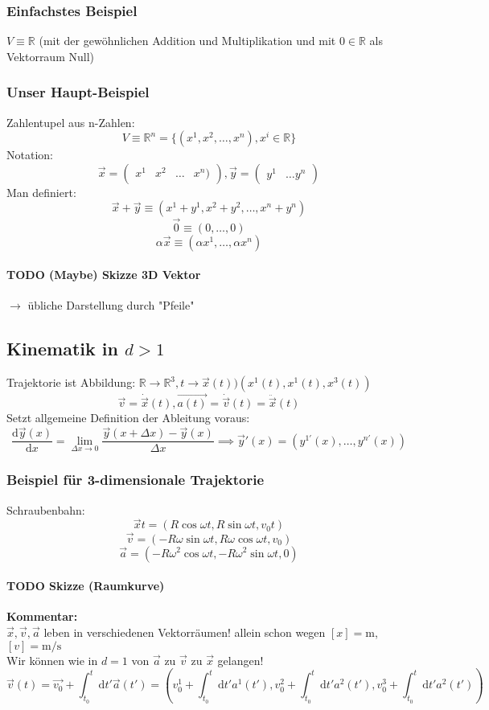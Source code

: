 \documentclass[a4paper]{scrartcl}
\theoremstyle{definition}
\theoremstyle{plain}
\theoremstyle{remark}
\theoremstyle{remark}
\begin{document}
\subsubsection{Einfachstes Beispiel}
\label{sec-2-4-1}
$V\equiv \mathbb{R}$ (mit der gewöhnlichen Addition und Multiplikation und mit $0\in\mathbb{R}$ als Vektorraum Null)
\subsubsection{Unser Haupt-Beispiel}
\label{sec-2-4-2}
Zahlentupel aus n-Zahlen:
\[V\equiv \mathbb{R}^n = \{(x^1,x^2,\ldots,x^n), x^i \in\mathbb{R}\}\]
Notation:
\[\vec{x} = \begin{pmatrix} x^1& x^2 & \ldots & x^n)\end{pmatrix}, \vec{y} = \begin{pmatrix} y^1 & \ldots y^n \end{pmatrix}\]
Man definiert:
\[\vec{x} + \vec{y} \equiv (x^1 + y^1, x^2 + y^2, \ldots, x^n + y^n)\]
\[\vec{0} \equiv (0,\ldots,0)\]
\[\alpha \vec{x} \equiv (\alpha x^1, \ldots, \alpha x^n)\]
\paragraph{{\bfseries\sffamily TODO} (Maybe) Skizze 3D Vektor}
\label{sec-2-4-2-1}
$\rightarrow$ übliche Darstellung durch "Pfeile"
\subsection{Kinematik in $d>1$}
\label{sec-2-5}
Trajektorie ist Abbildung: $\mathbb{R} \to \mathbb{R}^3, t\to \vec{x}(t) ) (x^1(t),x^1(t),x^3(t))$
\[\vec{v} = \dot{\vec{x}}(t), \vec{a(t)} = \dot{\vec{v}}(t) = \ddot{\vec{x}}(t)\]
Setzt allgemeine Definition der Ableitung voraus:
\[\frac{\mathrm{d}\vec{y}(x)}{\mathrm{d}x} = \lim_{\Delta x \to 0} \frac{\vec{y}(x + \Delta x) - \vec{y}(x)}{\Delta x}  \implies \vec{y}'(x) = (y^{1'}(x), \ldots,y^{n'}(x))\]
\subsubsection{Beispiel für 3-dimensionale Trajektorie}
\label{sec-2-5-1}
Schraubenbahn:
\[\vec{x}t = (R\cos{\omega t},R\sin{\omega t}, v_0 t)\]
\[\vec{v} = (-R\omega\sin{\omega t}, R\omega\cos{\omega t}, v_0)\]
\[\vec{a} = (-R\omega^2\cos{\omega t}, -R\omega^2\sin{\omega t}, 0)\]
\paragraph{{\bfseries\sffamily TODO} Skizze (Raumkurve)}
\label{sec-2-5-1-1}
\textbf{Kommentar:} \\
     $\vec{x},\vec{v},\vec{a}$ leben in verschiedenen Vektorräumen!
allein schon wegen $[x] = \si{\meter}$, $[v] = \si{\meter\per\second}$ \\
     Wir können wie in $d=1$ von $\vec{a}$ zu $\vec{v}$ zu $\vec{x}$ gelangen!
\[\vec{v}(t) = \vec{v_0} + \int_{t_0}^{t} \mathrm{d}t' \vec{a}(t') = (v_0^1 + \int_{t_0}^t \mathrm{d}t' a^1(t'), v_0^2 + \int_{t_0}^t \mathrm{d}t' a^2(t'), v_0^3 + \int_{t_0}^t \mathrm{d}t' a^2(t'))\]
\end{document}
